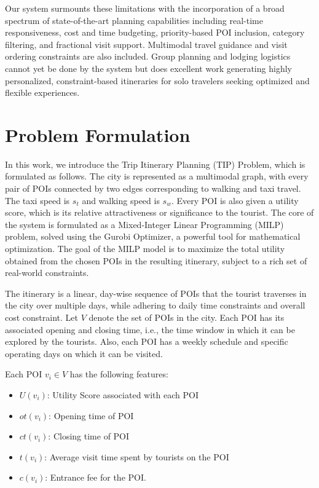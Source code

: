 \documentclass[sigconf,authordraft]{acmart}
\begin{document}
Our system surmounts these limitations with the incorporation of a broad spectrum of state-of-the-art planning capabilities including real-time responsiveness, cost and time budgeting, priority-based POI inclusion, category filtering, and fractional visit support. Multimodal travel guidance and visit ordering constraints are also included. Group planning and lodging logistics cannot yet be done by the system but does excellent work generating highly personalized, constraint-based itineraries for solo travelers seeking optimized and flexible experiences.

\section{Problem Formulation}

In this work, we introduce the Trip Itinerary Planning (TIP) Problem, which is formulated as follows. The city is represented as a multimodal graph, with every pair of POIs connected by two edges corresponding to walking and taxi travel. The taxi speed is $s_t$ and walking speed is $s_w$. Every POI is also given a utility score, which is its relative attractiveness or significance to the tourist. The core of the system is formulated as a Mixed-Integer Linear Programming (MILP) problem, solved using the Gurobi Optimizer, a powerful tool for mathematical optimization. The goal of the MILP model is to maximize the total utility obtained from the chosen POIs in the resulting itinerary, subject to a rich set of real-world constraints.

The itinerary is a linear, day-wise sequence of POIs that the tourist traverses in the city over multiple days, while adhering to daily time constraints and overall cost constraint. Let $V$ denote the set of POIs in the city. Each POI has its associated opening and closing time, i.e., the time window in which it can be explored by the tourists. Also, each POI has a weekly schedule and specific operating days on which it can be visited.

Each POI \( v_i \in V \) has the following features:

\begin{itemize}
    \item \( U(v_i) \): Utility Score associated with each POI
    \item \( ot(v_i) \): Opening time of POI
    \item \( ct(v_i) \): Closing time of POI
    \item \( t(v_i) \): Average visit time spent by tourists on the POI
    \item \( c(v_i) \): Entrance fee for the POI.
\end{itemize}
\end{document}
